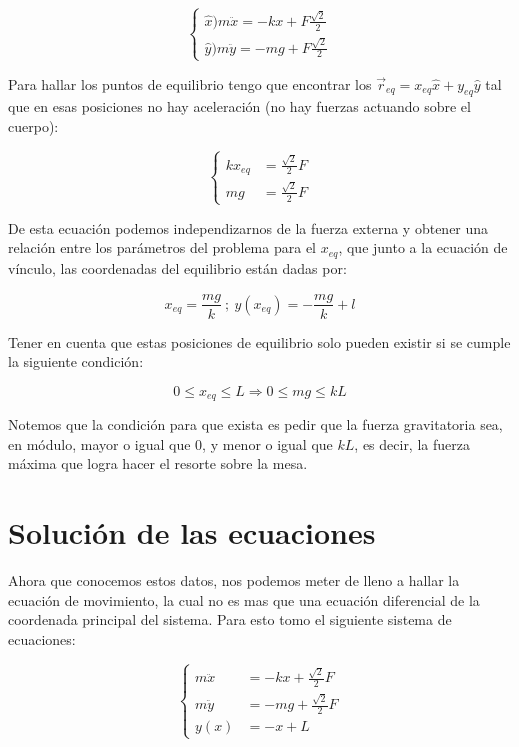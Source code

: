 \documentclass{article}
\begin{document}
\begin{multicols}{2}
\begin{equation}
\begin{cases}
    \hat{x}\big) m\ddot{x} = -kx + F\frac{\sqrt{2}}{2} \\
    \hat{y}\big) m\ddot{y} = -mg + F\frac{\sqrt{2}}{2}
\end{cases}
\end{equation}

Para hallar los puntos de equilibrio tengo que encontrar los $\vec{r}_{eq} = x_{eq} \hat{x} + y_{eq} \hat{y}$ tal que en esas posiciones no hay aceleración (no hay fuerzas actuando sobre el cuerpo):

\begin{equation}
\begin{cases}
    kx_{eq} &= \frac{\sqrt{2}}{2}F \\
    mg &= \frac{\sqrt{2}}{2}F
\end{cases}
\end{equation}

De esta ecuación podemos independizarnos de la fuerza externa y obtener una relación entre los parámetros del problema para el $x_{eq}$, que junto a la ecuación de vínculo, las coordenadas del equilibrio están dadas por:

\begin{equation}
    x_{eq} = \frac{mg}{k} \ ; \ y(x_{eq}) = -\frac{mg}{k} + l
\end{equation}

Tener en cuenta que estas posiciones de equilibrio solo pueden existir si se cumple la siguiente condición:

\begin{equation}
    0 \leq x_{eq} \leq L \Rightarrow 0 \leq mg \leq kL
\end{equation}

Notemos que la condición para que exista es pedir que la fuerza gravitatoria sea, en módulo, mayor o igual que $0$, y menor o igual que $kL$, es decir, la fuerza máxima que logra hacer el resorte sobre la mesa.

\section{Solución de las ecuaciones}
Ahora que conocemos estos datos, nos podemos meter de lleno a hallar la ecuación de movimiento, la cual no es mas que una ecuación diferencial de la coordenada principal del sistema. Para esto tomo el siguiente sistema de ecuaciones:

\begin{equation}
\begin{cases}
    m\ddot{x} &= -kx + \frac{\sqrt{2}}{2}F \\
    m\ddot{y} &= -mg + \frac{\sqrt{2}}{2}F \\
    y(x) &= -x + L
\end{cases}
\end{equation}


\end{multicols}
\end{document}

